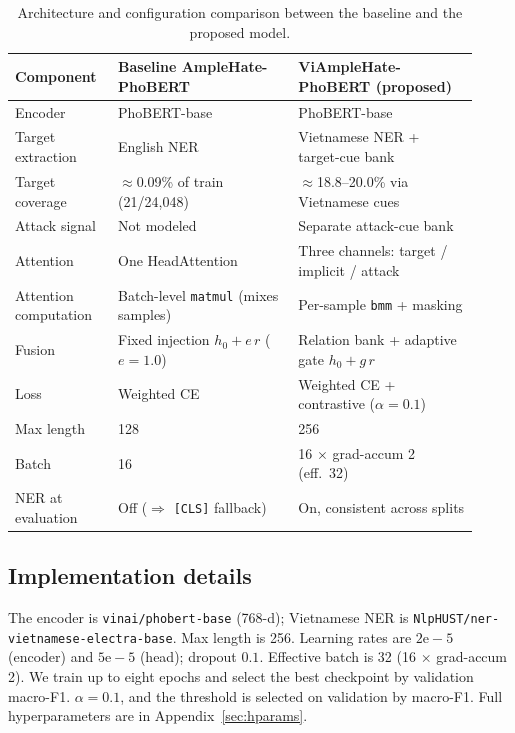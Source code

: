 \documentclass[11pt]{article}
\begin{document}
\begin{table}[t]
  \centering
  \small
  \begin{tabular}{p{0.20\linewidth} p{0.36\linewidth} p{0.36\linewidth}}
    \toprule
    \textbf{Component} & \textbf{Baseline AmpleHate-PhoBERT} & \textbf{ViAmpleHate-PhoBERT (proposed)} \\
    \midrule
    Encoder & PhoBERT-base & PhoBERT-base \\
    Target extraction & English NER & Vietnamese NER + target-cue bank \\
    Target coverage & $\approx$0.09\% of train (21/24{,}048) & $\approx$18.8--20.0\% via Vietnamese cues \\
    Attack signal & Not modeled & Separate attack-cue bank \\
    Attention & One HeadAttention & Three channels: target / implicit / attack \\
    Attention computation & Batch-level \texttt{matmul} (mixes samples) & Per-sample \texttt{bmm} + masking \\
    Fusion & Fixed injection $h_0+e\,r$ ($e{=}1.0$) & Relation bank + adaptive gate $h_0+g\,r$ \\
    Loss & Weighted CE & Weighted CE + contrastive ($\alpha{=}0.1$) \\
    Max length & 128 & 256 \\
    Batch & 16 & 16 $\times$ grad-accum 2 (eff.\ 32) \\
    NER at evaluation & Off ($\Rightarrow$ \texttt{[CLS]} fallback) & On, consistent across splits \\
    \bottomrule
  \end{tabular}
  \caption{Architecture and configuration comparison between the baseline and the proposed model.}
  \label{tab:arch}
\end{table}

\subsection{Implementation details}
The encoder is \texttt{vinai/phobert-base} (768-d); Vietnamese NER is \texttt{NlpHUST/ner-vietnamese-electra-base}. Max length is 256. Learning rates are $2\mathrm{e}{-}5$ (encoder) and $5\mathrm{e}{-}5$ (head); dropout $0.1$. Effective batch is 32 (16 $\times$ grad-accum 2). We train up to eight epochs and select the best checkpoint by validation macro-F1. $\alpha=0.1$, and the threshold is selected on validation by macro-F1. Full hyperparameters are in Appendix~\ref{sec:hparams}.
\end{document}
